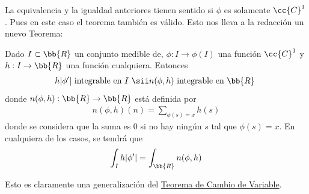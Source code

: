 La equivalencia y la igualdad anteriores tienen sentido si $\phi$ es solamente $\cc{C}^1$. Pues en este caso el teorema también es válido. Esto nos lleva a la redacción un nuevo Teorema:

\begin{teo}\label{teo:area}
    Dado $I \subset \bb{R}$ un conjunto medible de, $\phi: I \to \phi(I)$ una función $\cc{C}^1$ y $h:I \to \bb{R}$ una función cualquiera. Entonces 
    \begin{gather*}
        h|\phi'| \text{ integrable en $I$ } \sii n(\phi, h) \text{ integrable en $\bb{R}$ }
    \end{gather*}
    donde $n(\phi, h):\bb{R}\to \bb{R}$ está definida por
    \begin{gather*}
        n(\phi, h)(n) = \sum_{\phi(s)=x} h(s)
    \end{gather*}
    donde se considera que la suma es $0$ si no hay ningún $s$ tal que $\phi(s)=x$. En cualquiera de los casos, se tendrá que 
    \begin{gather*}
        \int_I h|\phi'| = \int_\bb{R} n(\phi, h) 
    \end{gather*}
\end{teo}

Esto es claramente una generalización del \hyperref[teo:cambio_variable]{Teorema de Cambio de Variable}.

